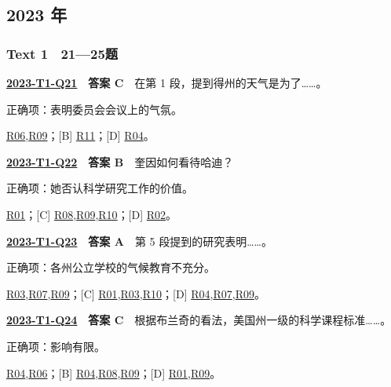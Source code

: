 \documentclass[11pt,a4paper]{article}
\begin{document}
\subsection{2023 年}\label{year-2023}
\subsubsection{Text 1　21—25题}
\label{idx-2023-T1-Q21}
\noindent\textbf{\href{https://zj139.github.io/math-notes/english/e1f5e5e385028dfa952ef339/\#q21}{2023-T1-Q21}　答案 C}　在第 1 段，提到得州的天气是为了……。\par\nopagebreak
\noindent 正确项：表明委员会会议上的气氛。\par\nopagebreak
\noindent [A] \hyperref[cat-R06]{R06},\hyperref[cat-R09]{R09}；[B] \hyperref[cat-R11]{R11}；[D] \hyperref[cat-R04]{R04}。
\par\smallskip
{}\label{idx-2023-T1-Q22}
\noindent\textbf{\href{https://zj139.github.io/math-notes/english/e1f5e5e385028dfa952ef339/\#q22}{2023-T1-Q22}　答案 B}　奎因如何看待哈迪？\par\nopagebreak
\noindent 正确项：她否认科学研究工作的价值。\par\nopagebreak
\noindent [A] \hyperref[cat-R01]{R01}；[C] \hyperref[cat-R08]{R08},\hyperref[cat-R09]{R09},\hyperref[cat-R10]{R10}；[D] \hyperref[cat-R02]{R02}。
\par\smallskip
{}\label{idx-2023-T1-Q23}
\noindent\textbf{\href{https://zj139.github.io/math-notes/english/e1f5e5e385028dfa952ef339/\#q23}{2023-T1-Q23}　答案 A}　第 5 段提到的研究表明……。\par\nopagebreak
\noindent 正确项：各州公立学校的气候教育不充分。\par\nopagebreak
\noindent [B] \hyperref[cat-R03]{R03},\hyperref[cat-R07]{R07},\hyperref[cat-R09]{R09}；[C] \hyperref[cat-R01]{R01},\hyperref[cat-R03]{R03},\hyperref[cat-R10]{R10}；[D] \hyperref[cat-R04]{R04},\hyperref[cat-R07]{R07},\hyperref[cat-R09]{R09}。
\par\smallskip
{}\label{idx-2023-T1-Q24}
\noindent\textbf{\href{https://zj139.github.io/math-notes/english/e1f5e5e385028dfa952ef339/\#q24}{2023-T1-Q24}　答案 C}　根据布兰奇的看法，美国州一级的科学课程标准……。\par\nopagebreak
\noindent 正确项：影响有限。\par\nopagebreak
\noindent [A] \hyperref[cat-R04]{R04},\hyperref[cat-R06]{R06}；[B] \hyperref[cat-R04]{R04},\hyperref[cat-R08]{R08},\hyperref[cat-R09]{R09}；[D] \hyperref[cat-R01]{R01},\hyperref[cat-R09]{R09}。
\end{document}
